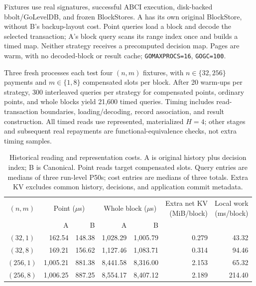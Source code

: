 Fixtures use real signatures, successful ABCI execution, disk-backed
bbolt/GoLevelDB, and frozen BlockStores. A has its own original
BlockStore, without B's backup-layout cost. Point queries load a block
and decode the selected transaction; A's block query scans its range
index once and builds a timed map. Neither strategy receives a
precomputed decision map. Pages are warm, with no decoded-block or
result cache; \texttt{GOMAXPROCS=16}, \texttt{GOGC=100}.

Three fresh processes each test four $(n,m)$ fixtures, with
$n\in\{32,256\}$ payments and $m\in\{1,8\}$ compensated slots per block.
After 20 warm-ups per strategy, 300 interleaved queries per strategy
for compensated points, ordinary points, and whole blocks yield
21,600 timed queries. Timing includes read-transaction boundaries,
loading/decoding, record association, and result construction.
All timed reads use represented, materialized $H=4$; other stages
and subsequent real repayments are functional-equivalence checks,
not extra timing samples.

\begin{table}[t]
  \caption{Historical reading and representation costs. A is original
    history plus decision index; B is Canonical. Point reads target
    compensated slots. Query entries are medians of three run-level
    P50s; cost entries are medians of three totals. Extra KV excludes
    common history, decisions, and application commit metadata.}
  \label{tab:eval-reader}
  \centering
  \small
  \setlength{\tabcolsep}{8pt}
  \begin{tabular}{@{}crrrrrr@{}}
    \toprule
    $(n,m)$ &
    \multicolumn{2}{c}{Point ($\mu$s)} &
    \multicolumn{2}{c}{Whole block ($\mu$s)} &
    \shortstack{Extra net KV\\(MiB/block)} &
    \shortstack{Local work\\(ms/block)} \\
    \cmidrule(lr){2-3}\cmidrule(lr){4-5}
    & A & B & A & B & & \\
    \midrule
    $(32,1)$  & 162.54  & 148.38 & 1,028.29 & 1,005.79 & 0.279 & 43.32 \\
    $(32,8)$  & 169.21  & 156.62 & 1,127.46 & 1,083.71 & 0.314 & 94.46 \\
    $(256,1)$ & 1,005.21 & 881.38 & 8,441.58 & 8,316.00 & 2.153 & 65.32 \\
    $(256,8)$ & 1,006.25 & 887.25 & 8,554.17 & 8,407.12 & 2.189 & 214.40 \\
    \bottomrule
  \end{tabular}
\end{table}

